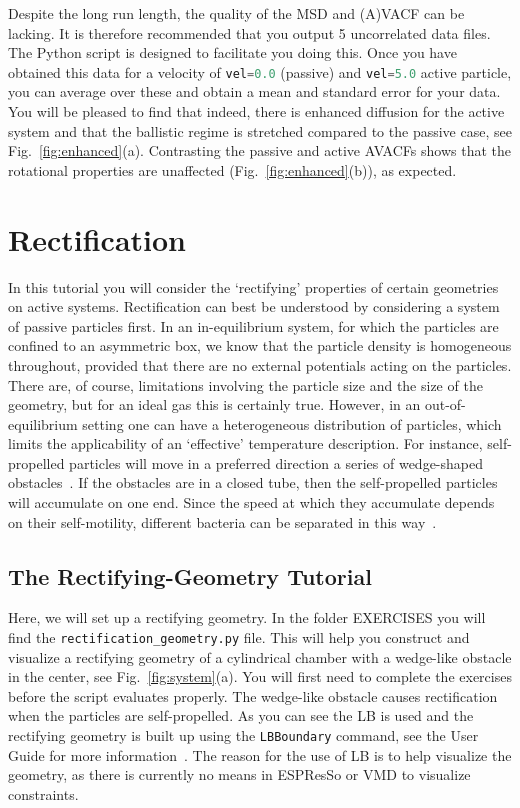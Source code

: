 \documentclass[aip,jcp,reprint,a4paper,onecolumn,amsmath]{revtex4-1}
\newcommand\code{\lstinline}
\newcommand{\es}{\mbox{\textsf{ESPResSo}}\xspace}
\newcommand\codees{\lstinline[language=python]}
\begin{document}
Despite the long run length, the quality of the MSD and (A)VACF can be lacking. It is therefore recommended that you output 5 uncorrelated data files. The Python script is designed to facilitate you doing this. Once you have obtained this data for a velocity of \codees{vel=0.0} (passive) and \codees{vel=5.0} active particle, you can average over these and obtain a mean and standard error for your data. You will be pleased to find that indeed, there is enhanced diffusion for the active system and that the ballistic regime is stretched compared to the passive case, see Fig.~\ref{fig:enhanced}(a). Contrasting the passive and active AVACFs shows that the rotational properties are unaffected (Fig.~\ref{fig:enhanced}(b)), as expected.

\section{\label{sec:rectify}Rectification}

In this tutorial you will consider the `rectifying' properties of certain geometries on active systems. Rectification can best be understood by considering a system of passive particles first. In an in-equilibrium system, for which the particles are confined to an asymmetric box, we know that the particle density is homogeneous throughout, provided that there are no external potentials acting on the particles. There are, of course, limitations involving the particle size and the size of the geometry, but for an ideal gas this is certainly true. However, in an out-of-equilibrium setting one can have a heterogeneous distribution of particles, which limits the applicability of an `effective' temperature description. For instance, self-propelled particles will move in a preferred direction a series of wedge-shaped obstacles~\cite{Berdakin13a}. If the obstacles are in a closed tube, then the self-propelled particles will accumulate on one end. Since the speed at which they accumulate depends on their self-motility, different bacteria can be separated in this way~\cite{Berdakin13b}.

\subsection{\label{sub:rgtut}The Rectifying-Geometry Tutorial}

Here, we will set up a rectifying geometry. In the folder EXERCISES you will find the \code{rectification_geometry.py} file. This will help you construct and visualize a rectifying geometry of a cylindrical chamber with a wedge-like obstacle in the center, see Fig.~\ref{fig:system}(a). You will first need to complete the exercises before the script evaluates properly. The wedge-like obstacle causes rectification when the particles are self-propelled. As you can see the LB is used and the rectifying geometry is built up using the \codees{LBBoundary} command, see the User Guide for more information~\cite{UG}. The reason for the use of LB is to help visualize the geometry, as there is currently no means in \es{} or VMD to visualize constraints.
\end{document}
